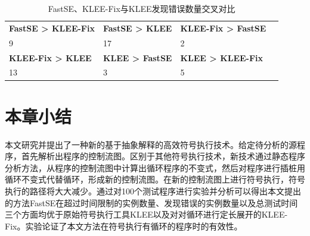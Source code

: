 \begin{table}[ht]
\begin{center}
\caption{FastSE、KLEE-Fix与KLEE发现错误数量交叉对比}
\label{FastSE_KLEE-Fix与KLEE发现错误数量交叉对比}
\begin{small}
\begin{tabular}{|l|l|l|l|}
\hline
{\bf FastSE > KLEE-Fix} & {\bf FastSE > KLEE} & {\bf KLEE-Fix > FastSE} \\
9 & 17 & 2 \\ \hline
{\bf KLEE-Fix > KLEE} & {\bf KLEE > FastSE} & {\bf KLEE > KLEE-Fix} \\
13 & 3 & 5\\
\hline
\end{tabular}
\end{small}
\end{center}
\end{table}


%


\section{本章小结}
\label{sec-conclusion}
本文研究并提出了一种新的基于抽象解释的高效符号执行技术。给定待分析的源程序，首先解析出程序的控制流图。区别于其他符号执行技术，新技术通过静态程序分析方法，从程序的控制流图中计算出循环程序的不变式，然后对程序进行插桩用循环不变式代替循环，形成新的控制流图。在新的控制流图上进行符号执行，符号执行的路径将大大减少。通过对100个测试程序进行实验并分析可以得出本文提出的方法FastSE在超过时间限制的实例数量、发现错误的实例数量以及总测试时间三个方面均优于原始符号执行工具KLEE以及对对循环进行定长展开的KLEE-Fix。实验论证了本文方法在符号执行有循环的程序时的有效性。

